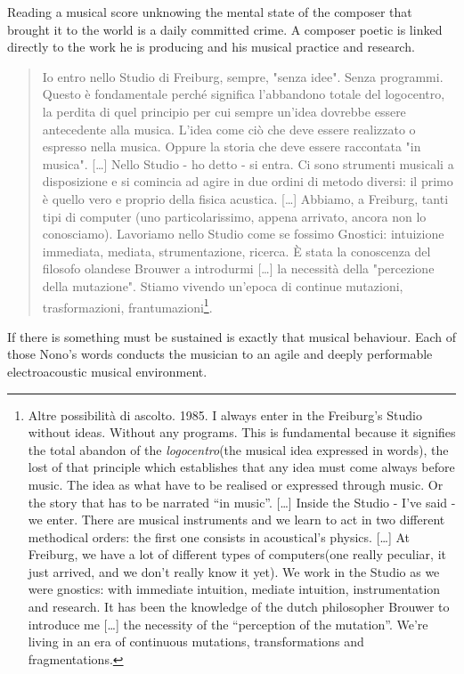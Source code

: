 \documentclass[twoside,a4paper]{article}
\begin{document}
Reading a musical score unknowing the mental state of the composer that brought it to the world is a daily committed crime. A composer poetic is linked directly to the work he is producing and his musical practice and research.

\begin{quote}
Io entro nello Studio di Freiburg, sempre, "senza idee". Senza programmi. Questo è fondamentale perché significa l'abbandono totale del logocentro, la perdita di quel principio per cui sempre un'idea dovrebbe essere antecedente alla musica. L'idea come ciò che deve essere realizzato o espresso nella musica. Oppure la storia che deve essere raccontata "in musica". [\ldots] Nello Studio - ho detto - si entra. Ci sono strumenti musicali a disposizione e si comincia ad agire in due ordini di metodo diversi: il primo è quello vero e proprio della fisica acustica. [\ldots] Abbiamo, a Freiburg, tanti tipi di computer (uno particolarissimo, appena arrivato, ancora non lo conosciamo). Lavoriamo nello Studio come se fossimo Gnostici: intuizione immediata, mediata, strumentazione, ricerca. È stata la conoscenza del filosofo olandese Brouwer a introdurmi [\ldots] la necessità della "percezione della mutazione". Stiamo vivendo un'epoca di continue mutazioni, trasformazioni, frantumazioni\footnote{Altre possibilità di ascolto. 1985. I always enter in the Freiburg’s Studio without ideas. Without any programs. This is fundamental because it signifies the total abandon of the \textit{logocentro}(the musical idea expressed in words), the lost of that principle which establishes that any idea must come always before music. The idea as what have to be realised or expressed through music. Or the story that has to be narrated “in music”. [\dots] Inside the Studio - I’ve said - we enter. There are musical instruments and we learn to act in two different methodical orders: the first one consists in acoustical’s physics. [\dots] At Freiburg, we have a lot of different types of computers(one really peculiar, it just arrived, and we don’t really know it yet). We work in the Studio as we were gnostics: with immediate intuition, mediate intuition, instrumentation and research. It has been the knowledge of the dutch philosopher Brouwer to introduce me [\dots] the necessity of the “perception of the mutation”. We’re living in an era of continuous mutations, transformations and fragmentations.}. 
\end{quote}

If there is something must be sustained is exactly that musical behaviour. Each of those Nono's words conducts the musician to an agile and deeply performable electroacoustic musical environment. 
\end{document}
